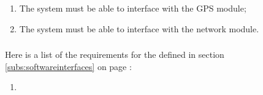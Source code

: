 \begin{enumerate} [resume*]

\item The system must be able to interface with the GPS module;

\item The system must be able to interface with the network module.



\end{enumerate} 


\subsubsection{} %
Here is a list of the requirements for the  defined in section \ref{subs:softwareinterfaces} on page \pageref{subs:softwareinterfaces}:

\begin{enumerate} [resume*]
\item 
\end{enumerate}



\subsubsection{} %


